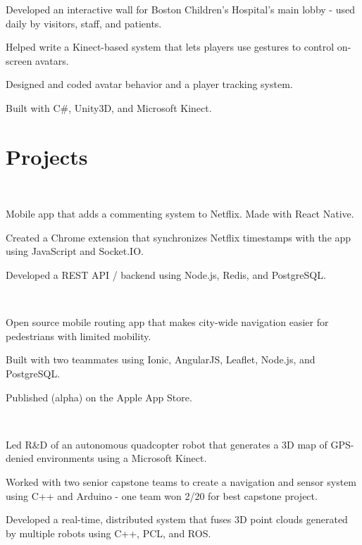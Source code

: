 \documentclass[]{deedy-resume}
\begin{document}
\begin{minipage}[t]{0.61\textwidth}
\begin{tightemize}
\item Developed an interactive wall for Boston Children's Hospital's main lobby - used daily by visitors, staff, and patients.
\item Helped write a Kinect-based system that lets players use gestures to control on-screen avatars.
\item Designed and coded avatar behavior and a player tracking system.
\item Built with C\#, Unity3D, and Microsoft Kinect.
\end{tightemize}


\section{Projects}
 \\
\begin{tightemize}
\item Mobile app that adds a commenting system to Netflix. Made with React Native.
\item Created a Chrome extension that synchronizes Netflix timestamps with the app using JavaScript and Socket.IO.
\item Developed a REST API / backend using Node.js, Redis, and PostgreSQL.
\end{tightemize}
\sectionsep

 \\
\begin{tightemize}
\item Open source mobile routing app that makes city-wide navigation easier for pedestrians with limited mobility.
\item Built with two teammates using Ionic, AngularJS, Leaflet, Node.js, and PostgreSQL.
\item Published (alpha) on the Apple App Store.
\end{tightemize}
\sectionsep

 \\
\begin{tightemize}
\item Led R\&D of an autonomous quadcopter robot that generates a 3D map of GPS-denied environments using a Microsoft Kinect.
\item Worked with two senior capstone teams to create a navigation and sensor system using C++ and Arduino - one team won 2/20 for best capstone project.
\item Developed a real-time, distributed system that fuses 3D point clouds generated by multiple robots using C++, PCL, and ROS.
\end{tightemize}
\sectionsep

\end{minipage}
\end{document}
